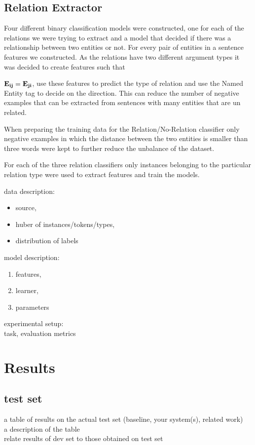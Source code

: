 \documentclass[10pt, a4paper]{article}
\begin{document}
\subsection{Relation Extractor}
Four different binary classification models were constructed, one for each of the relations we were trying to extract and a model that decided if there was a relationship between two entities or not. For every pair of entities in a sentence features we constructed. As the relations have two different argument types it was decided to create features such that {$\bf E_{ij}=E_{ji}$, use these features to predict the type of relation and use the Named Entity tag to decide on the direction. This can reduce the number of negative examples that can be extracted from sentences with many entities that are un related. 

When preparing the training data for the Relation/No-Relation classifier only negative examples in which the distance between the two entities is smaller than three words were kept to further reduce the unbalance of the dataset.

For each of the three relation classifiers only instances belonging to the particular relation type were used to extract features and train the models.


data description:\\
\begin{itemize}
	\item source,
	\item huber of instances/tokens/types, 
	\item distribution of labels
\end{itemize}

model description:
\begin{enumerate}
	\item features, 
	\item learner, 
	\item parameters
\end{enumerate}

experimental setup:\\
task, evaluation metrics

\section{Results}
\subsection{test set}
a table of results on the actual test set (baseline, your system(s), related work)\\
a description of the table\\
relate results of dev set to those obtained on test set
}
\end{document}

